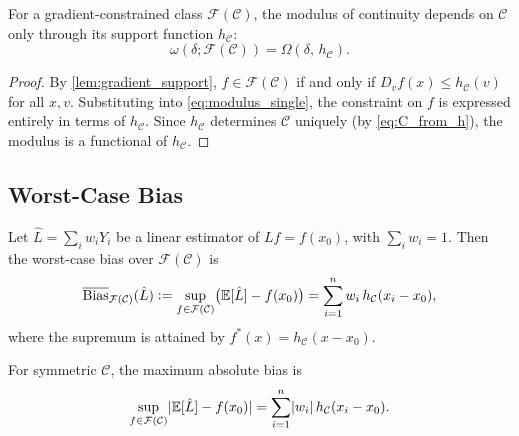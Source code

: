\begin{corollary}\label{cor:modulus_functional}
	For a gradient-constrained class $\mathcal{F}(\mathcal{C})$, the modulus of continuity depends on $\mathcal{C}$ only through its support function $h_{\mathcal{C}}$:
	\begin{equation*}
		\omega(\delta; \mathcal{F}(\mathcal{C})) = \Omega(\delta,\, h_{\mathcal{C}}).
	\end{equation*}
\end{corollary}

\begin{proof}
	By \cref{lem:gradient_support}, $f \in \mathcal{F}(\mathcal{C})$ if and only if $D_v f(x) \leq h_{\mathcal{C}}(v)$ for all $x, v$.
	Substituting into \eqref{eq:modulus_single}, the constraint on $f$ is expressed entirely in terms of $h_{\mathcal{C}}$.
	Since $h_{\mathcal{C}}$ determines $\mathcal{C}$ uniquely (by \eqref{eq:C_from_h}), the modulus is a functional of $h_{\mathcal{C}}$.
\end{proof}


\subsection{Worst-Case Bias}\label{sec:technical:wcb}

\begin{proposition}\label{prop:wcb}
	Let $\hat{L} = \sum_{i} w_i Y_i$ be a linear estimator of $Lf = f(x_0)$, with $\sum_i w_i = 1$.
	Then the worst-case bias over $\mathcal{F}(\mathcal{C})$ is
	\begin{equation}\label{eq:wcb_general}
		\overline{\mathrm{Bias}}_{\mathcal{F}(\mathcal{C})}(\hat{L}) \vcentcolon= \sup_{f \in \mathcal{F}(\mathcal{C})} \bigl( \operatorname{\mathbb{E}}[\hat{L}] - f(x_0) \bigr) = \sum_{i=1}^n w_i \, h_{\mathcal{C}}(x_i - x_0),
	\end{equation}
	where the supremum is attained by $f^*(x) = h_{\mathcal{C}}(x - x_0)$.

	For symmetric $\mathcal{C}$, the maximum absolute bias is
	\begin{equation}\label{eq:wcb_abs}
		\sup_{f \in \mathcal{F}(\mathcal{C})} \lvert\operatorname{\mathbb{E}}[\hat{L}] - f(x_0)\rvert = \sum_{i=1}^n \lvert w_i\rvert \, h_{\mathcal{C}}(x_i - x_0).
	\end{equation}
\end{proposition}

